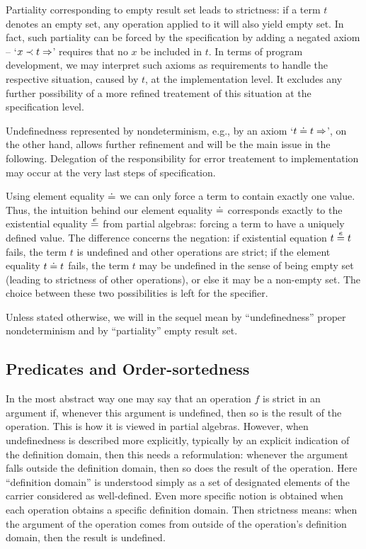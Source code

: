 \documentclass[10pt]{article}
\begin{document}

Partiality corresponding to empty result set leads to strictness: if a term
$t$ denotes an empty set, any operation applied to it will also yield empty set.
In fact, such partiality
can be forced by the specification by adding a negated axiom -- `$x\prec
t\Rightarrow$' requires that no $x$ be included in $t$. In terms of program development,
we may interpret such axioms as requirements to handle the respective 
situation, caused by $t$, at the implementation level. It
excludes any further possibility of a more refined treatement of
this situation at the specification level. 

Undefinedness represented by nondeterminism, e.g., by an axiom `$t\mathrel{\dot{=} }
t\Rightarrow$', on the other hand, allows
further refinement and will be the main issue in the following. 
 Delegation of
the responsibility for error treatement to implementation may occur at the
very last steps of specification.

Using element equality $\mathrel{\dot{=} }$ we can 
only force a term to contain exactly one value. Thus, the intuition behind our element equality
$\mathrel{\dot{=} }$ corresponds exactly to the existential equality $\stackrel{e}{=}$ from partial
algebras: forcing a term to have a uniquely defined value.
The difference concerns the negation: if existential equation $t\stackrel{e}{=} t$
fails, the term $t$ is undefined and other operations are strict; if the
element equality $t\mathrel{\dot{=} } t$ fails, the term $t$ may be undefined in the sense
of being empty set (leading to strictness of other operations), or else it
may be a non-empty set. The choice between these two possibilities is left
for the specifier.

Unless stated otherwise, we will in the sequel mean by ``undefinedness'' proper
nondeterminism and by ``partiality'' empty result set.

\subsection{Predicates and Order-sortedness}
In the most abstract way one may say that an operation $f$ is strict in an
argument if, whenever this argument is undefined, then so is the result of
the operation. This is how it is viewed in partial algebras. However, when
undefinedness is described more explicitly, typically by an explicit
indication of the definition domain, then this needs a
reformulation: whenever the  argument falls outside  the definition
domain, then so does the result of the operation. Here ``definition domain''
is understood simply as a set of designated elements of the carrier
considered as well-defined. Even more specific notion is obtained when 
each operation obtains a specific definition domain. Then strictness means:
when the argument of the operation comes from outside of the operation's definition
domain, then the result is undefined.
\end{document}
